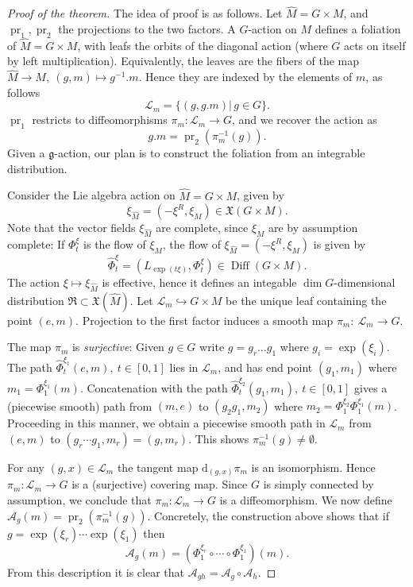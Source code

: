 \documentclass{article}
\theoremstyle{remark}
\newcommand\A{\mathcal{A}}
\newcommand{\pr}{\on{pr}}
\newcommand\lie[1]{\mathfrak{#1}}
\newcommand{\g}{\lie{g}}
\newcommand{\on}{\operatorname}
\newcommand{\hra}{\hookrightarrow}
\renewcommand{\d}{{\mbox{d}}}
\newcommand{\ca}{\mathcal}
\newcommand{\wh}{\widehat}
\newcommand{\mf}{\mathfrak}
\begin{document}
\begin{proof}[Proof of the theorem]
The idea of proof is as follows. Let $\wh{M}=G\times M$, and $\pr_1,\pr_2$ the projections to the 
two factors. A $G$-action on $M$ defines a foliation of $\wh{M}=G\times M$, with leafs 
the orbits of the diagonal action (where $G$ acts on itself by left multiplication). Equivalently, the 
leaves are the fibers of the map $\wh{M}\to M,\ (g,m)\mapsto g^{-1}.m$. Hence they are indexed by 
the elements of $m$, as follows  
% 
\[ \ca{L}_m=\{(g,g.m)|\,g\in G\}.\] 
%
$\pr_1$ restricts to diffeomorphisms $\pi_m\colon \ca{L}_m\to G$, and we recover the action as 
\[ g.m= \pr_2(\pi_m^{-1}(g)).\]
%
Given a $\g$-action, our plan is to construct the foliation from an integrable distribution. 

Consider the Lie algebra action on $\wh{M}=G\times M$, given by 
\[ \xi_{\wh{M}}=(-\xi^R,\xi_M)\in\mf{X}(G\times M).\]
%
Note that the vector fields $\xi_{\wh{M}}$ are complete, since $\xi_M$ are by assumption complete: If $\Phi_t^\xi$ is the flow of $\xi_M$, the flow of $\xi_{\wh{M}}=(-\xi^R,\xi_M)$ is given by 
%
\[ \wh{\Phi}_t^\xi=(L_{\exp(t\xi)},\Phi_t^\xi)\in\on{Diff}(G\times M).\] 
%  
The action $\xi\mapsto \xi_{\wh{M}}$ is effective, hence it defines an integable $\dim G$-dimensional distribution 
$\mf{R}\subset \mf{X}(\wh{M})$.  Let $\ca{L}_m\hra G\times M$ be the unique leaf
containing the point $(e,m)$. Projection to the first factor induces
a smooth map $\pi_m:\ \ca{L}_m\to G$. 
%

The map $\pi_m$ is \emph{surjective}: Given $g\in G$ write $g=g_r\ldots g_1$ where 
$g_i=\exp(\xi_i)$.
The path $\wh{\Phi}_{t}^{\xi_1}(e,m),\ t\in [0,1]$ lies in $\ca{L}_m$, and has end point $(g_1,m_1)$ 
where $m_1=\Phi_1^{\xi_1}(m)$. Concatenation with the path 
$\wh{\Phi}_{t}^{\xi_2}(g_1,m_1),\ t\in [0,1]$ gives a (piecewise smooth) path from $(m,e)$ to 
$(g_2g_1,m_2)$ where $m_2=\Phi_1^{\xi_2}\Phi_1^{\xi_1}(m)$. Proceeding in this manner, 
we obtain a piecewise smooth path in $\ca{L}_m$ from $(e,m)$ to $(g_r\cdots g_1,m_r)=(g,m_r)$. 
This shows $\pi_m^{-1}(g)\not=\emptyset$. 

For any $(g,x)\in\ca{L}_m$ the tangent map $\d_{(g,x)} \pi_m$ is an isomorphism. 
Hence $\pi_m\colon \ca{L}_m\to G$ is a (surjective) covering map. Since $G$ is simply connected 
by assumption, we conclude that $\pi_m\colon \ca{L}_m\to G$ is a diffeomorphism.  
We now define $\A_g(m)= \pr_2(\pi_m^{-1}(g))$. Concretely, the construction above shows that if $g=\exp(\xi_r)\cdots \exp(\xi_1)$ then 
%
\[ \A_g(m)=(\Phi^{\xi_r}_{1}\circ \cdots \circ \Phi^{\xi_1}_{1})(m).\]
%
From this description it is clear that $\A_{gh}=\A_g\circ \A_h$. 
\end{proof}
\end{document}
